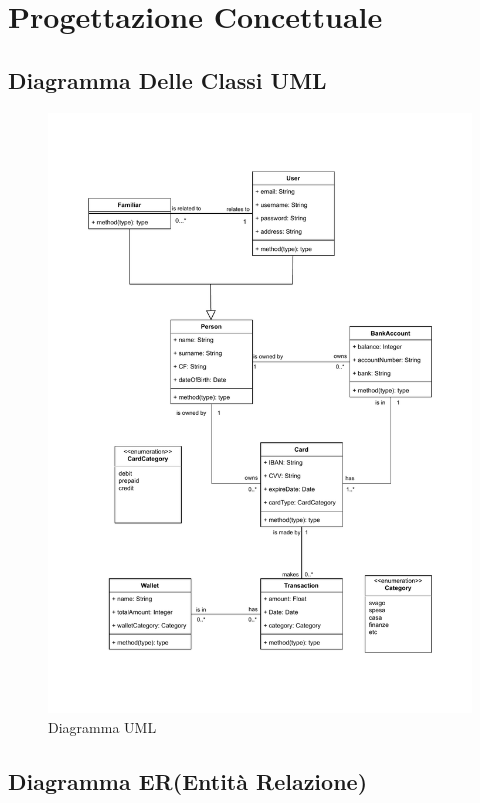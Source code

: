 \chapter{Progettazione Concettuale}

\section{Diagramma Delle Classi UML}

\begin{figure}[ht!]
    \centering
    \includegraphics[scale=0.55]{pdfs/UMLdiagram.drawio.pdf}
    \caption{Diagramma UML}\label{UML}
\end{figure}

\section{Diagramma ER(Entità Relazione)}

